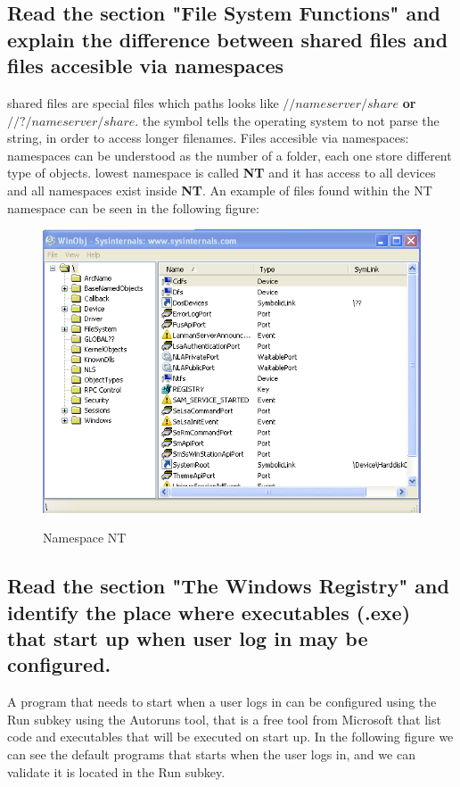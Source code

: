 \documentclass[10pt,a4paper]{article} %
\begin{document}
        \subsection{Read the section "File System Functions" and explain the
        difference between shared files and files accesible via namespaces}

        shared files are special files which paths looks like  \textbf{$
        //nameserver/share  $}
        \textbf{or}   \textit{\textbf{\textbf{\textbf{$ //?/nameserver/share
        $}}}}. the symbol  tells the operating
        system to  not parse the string, in order to access longer
        filenames.
        Files accesible via namespaces:
        namespaces can be understood as the number of a folder, each one store
        different type of objects.
        lowest namespace is called \textbf{NT}  and it has access to all devices
        and  all namespaces exist inside \textbf{NT}.
        An example of files found within the NT namespace can be seen in the
        following figure:

        \begin{figure}[h]
            \centering
            \includegraphics[scale=0.5]{1.png}
            \label{1}
            \caption{Namespace NT}
        \end{figure}

        \subsection{Read the section "The Windows Registry" and identify the place
        where executables (.exe) that start up when user log in may be configured.}
        A program that needs to start when a user logs in can be configured using
        the Run subkey using the Autoruns tool, that is a  free tool from Microsoft
        that list code and executables that will be executed on start up. In the
        following figure we can see the default programs that starts when the user
        logs in, and we can validate it is located in the Run subkey.
\end{document}
